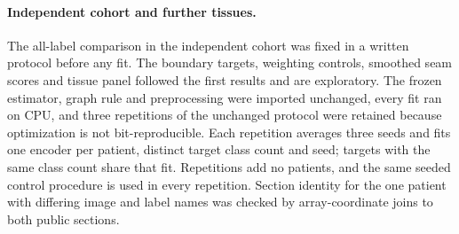 \documentclass[11pt]{article}
\begin{document}
\paragraph{Independent cohort and further tissues.} The all-label comparison in the independent cohort was fixed in a written protocol before any fit. The boundary targets, weighting controls, smoothed seam scores and tissue panel followed the first results and are exploratory. The frozen estimator, graph rule and preprocessing were imported unchanged, every fit ran on CPU, and three repetitions of the unchanged protocol were retained because optimization is not bit-reproducible. Each repetition averages three seeds and fits one encoder per patient, distinct target class count and seed; targets with the same class count share that fit. Repetitions add no patients, and the same seeded control procedure is used in every repetition. Section identity for the one patient with differing image and label names was checked by array-coordinate joins to both public sections.
\end{document}
